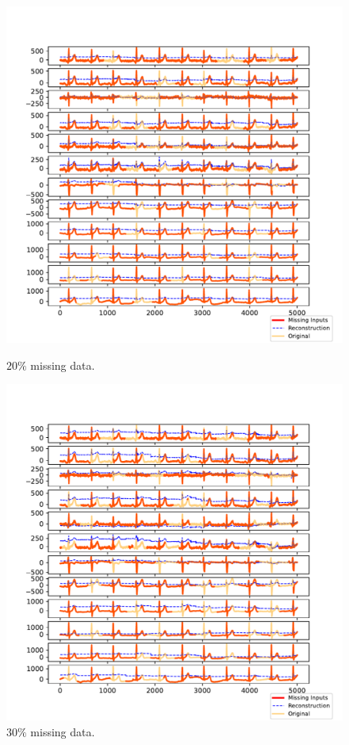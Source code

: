 \documentclass{mldsmsc}
\begin{document}
\begin{figure}[H]
\centering
\begin{minipage}{0.4\linewidth}
    \centering
    \includegraphics[width=\linewidth]{images/missing/mlesmf_output_20_10.pdf}
    \caption{$20\%$ missing data.}
\end{minipage}%
\hspace{0.05\linewidth}
\begin{minipage}{0.4\linewidth}
    \centering
    \includegraphics[width=\linewidth]{images/missing/mlesmf_output_30_10.pdf}
    \caption{$30\%$ missing data.}
\end{minipage}


\end{figure}
\end{document}
